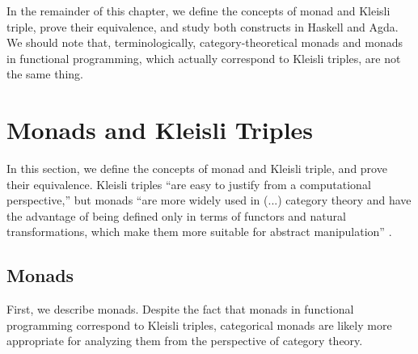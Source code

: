 In the remainder of this chapter, we define the concepts of monad and
Kleisli triple, prove their equivalence, and study both constructs in
Haskell and Agda. We should note that, terminologically,
category-theoretical monads and monads in functional programming,
which actually correspond to Kleisli triples, are not the same thing.

\section{Monads and Kleisli Triples}
\label{sec:monads}

In this section, we define the concepts of monad and Kleisli triple,
and prove their equivalence. Kleisli triples ``are easy to justify
from a computational perspective,'' but monads ``are more widely used
in (...) category theory and have the advantage of being defined only
in terms of functors and natural transformations, which make them more
suitable for abstract manipulation'' \parencite[60]{moggi-1991}.

\subsection{Monads}

First, we describe monads. Despite the fact that monads in functional
programming correspond to Kleisli triples, categorical monads are
likely more appropriate for analyzing them from the perspective of
category theory.

